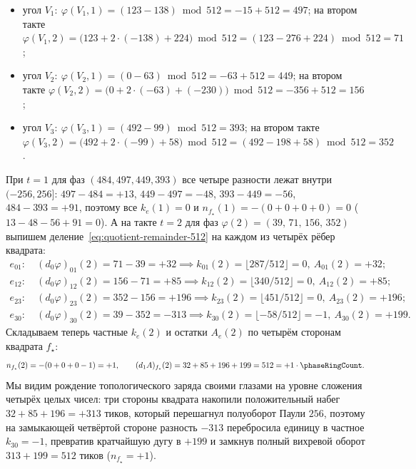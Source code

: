 \begin{corollary}[Единство природы и количества заряда: частное и остаток одного деления на $\phaseRingCount = 512$]
\begin{enumerate}[label=(\roman*)]
\begin{enumerate}[label=(\alph*),nosep]
\begin{itemize}[nosep,leftmargin=*]
    \item угол $V_1\colon\ \varphi(V_1,1) = (123 - 138)\bmod 512 = -15 + 512 = 497$;
      на втором такте $\varphi(V_1,2) = \bigl(123 + 2\cdot(-138) + 224\bigr)\bmod 512 = (123 - 276 + 224)\bmod 512 = 71$;
    \item угол $V_2\colon\ \varphi(V_2,1) = (0 - 63)\bmod 512 = -63 + 512 = 449$;
      на втором такте $\varphi(V_2,2) = \bigl(0 + 2\cdot(-63) + (-230)\bigr)\bmod 512 = -356 + 512 = 156$;
    \item угол $V_3\colon\ \varphi(V_3,1) = (492 - 99)\bmod 512 = 393$;
      на втором такте $\varphi(V_3,2) = \bigl(492 + 2\cdot(-99) + 58\bigr)\bmod 512 = (492 - 198 + 58)\bmod 512 = 352$.
    \end{itemize}
    При $t=1$ для фаз $(484,497,449,393)$ все четыре разности лежат внутри $(-256,256]$: $497-484=+13$, $449-497=-48$, $393-449=-56$, $484-393=+91$, поэтому все $k_e(1)=0$ и $n_{f_\star}(1) = -(0+0+0+0) = 0$ ($13-48-56+91=0$).
    А на такте $t=2$ для фаз $\varphi(2) = (39,\,71,\,156,\,352)$ выпишем деление~\eqref{eq:quotient-remainder-512} на каждом из четырёх рёбер квадрата:
    \begin{align*}
      e_{01}\colon &\ (d_0\varphi)_{01}(2) = 71 - 39 = +32 \implies k_{01}(2) = \lfloor 287/512\rfloor = 0,\ A_{01}(2) = +32;\\
      e_{12}\colon &\ (d_0\varphi)_{12}(2) = 156 - 71 = +85 \implies k_{12}(2) = \lfloor 340/512\rfloor = 0,\ A_{12}(2) = +85;\\
      e_{23}\colon &\ (d_0\varphi)_{23}(2) = 352 - 156 = +196 \implies k_{23}(2) = \lfloor 451/512\rfloor = 0,\ A_{23}(2) = +196;\\
      e_{30}\colon &\ (d_0\varphi)_{30}(2) = 39 - 352 = -313 \implies k_{30}(2) = \lfloor -58/512\rfloor = -1,\ A_{30}(2) = +199.
    \end{align*}
    Складываем теперь частные $k_e(2)$ и остатки $A_e(2)$ по четырём сторонам квадрата $f_\star$:
    \[
      n_{f_\star}(2) = -(0 + 0 + 0 - 1) = +1,
      \qquad
      (d_1 A)_{f_\star}(2) = 32 + 85 + 196 + 199 = 512 = +1\cdot\phaseRingCount.
    \]
    Мы видим рождение топологического заряда своими глазами на уровне сложения четырёх целых чисел: три стороны квадрата накопили положительный набег $32 + 85 + 196 = +313$ тиков, который перешагнул полуоборот Паули $256$, поэтому на замыкающей четвёртой стороне разность $-313$ перебросила единицу в частное $k_{30}=-1$, превратив кратчайшую дугу в $+199$ и замкнув полный вихревой оборот $313 + 199 = 512$ тиков ($n_{f_\star}=+1$).
  \end{enumerate}

\end{enumerate}
\end{corollary}
